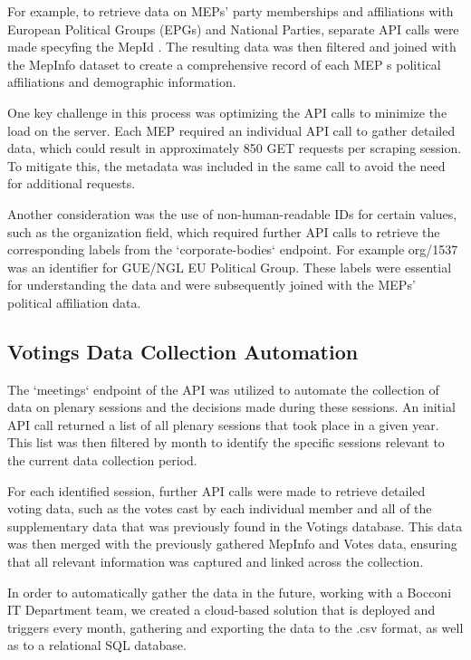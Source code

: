 \documentclass{article}
\begin{document}
    For example, to retrieve data on MEPs' party memberships and affiliations with European Political Groups (EPGs) and
    National Parties, separate API calls were made specyfing the MepId . The resulting data was then filtered and joined
    with the MepInfo dataset to create a comprehensive record of each MEP s political affiliations and demographic
    information.

    One key challenge in this process was optimizing the API calls to minimize the load on the server. Each MEP required
    an individual API call to gather detailed data, which could result in approximately 850 GET requests per scraping
    session. To mitigate this, the metadata was included in the same call to avoid the need for additional requests.

    Another consideration was the use of non-human-readable IDs for certain values, such as the organization field,
    which required further API calls to retrieve the corresponding labels from the `corporate-bodies` endpoint. For
    example org/1537 was an identifier for GUE/NGL EU Political Group. These labels were essential for understanding the
    data and were subsequently joined with the MEPs' political affiliation data.

    \subsection{Votings Data Collection Automation}

    The `meetings` endpoint of the API was utilized to automate the collection of data on plenary sessions and the
    decisions made during these sessions. An initial API call returned a list of all plenary sessions that took place in
    a given year. This list was then filtered by month to identify the specific sessions relevant to the current data
    collection period.

    For each identified session, further API calls were made to retrieve detailed voting data, such as the votes cast by
    each individual member and all of the supplementary data that was previously found in the Votings database. This
    data was then merged with the previously gathered MepInfo and Votes data, ensuring that all relevant information was
    captured and linked across the collection.

    In order to automatically gather the data in the future, working with a Bocconi IT Department team, we created a
    cloud-based solution that is deployed and triggers every month, gathering and exporting the data to the .csv format,
    as well as to a relational SQL database.
\end{document}

